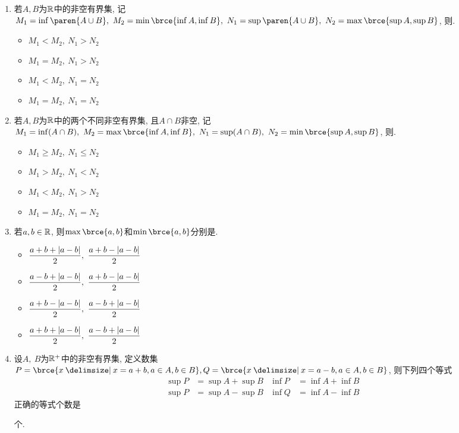 \documentclass[a4paper,punct=CCT]{ctexbook}
\theoremstyle{break}
\newif\ifshowsol
\let\leq\leqslant
\let\le\leq
\let\geq\geqslant
\let\ge\geq}
\begin{document}
\begin{enumerate}
\item 若\(A, B\)为\(\mathbb{R}\)中的非空有界集, 记\(M_1 = \inf\paren{A \cup B},\ M_2 = \min\brce{\inf A, \inf B},\ N_1 = \sup\paren{A \cup B},\ N_2 = \max\brce{\sup A, \sup B}\), 则\uline{\makebox[4em]{}}.
  \begin{itemize}
    \renewcommand{\labelitemi}{\faCircleThin}
  \item \(M_1 < M_2,\ N_1 > N_2\)
  \item \(M_1 = M_2,\ N_1 > N_2\)
  \item \(M_1 < M_2,\ N_1 = N_2\)
    \ifshowsol
  \item[\faCircle] \(M_1 = M_2,\ N_1 = N_2\)
    \else
  \item \(M_1 = M_2,\ N_1 = N_2\)
    \fi
  \end{itemize}

\item 若\(A, B\)为\(\mathbb{R}\)中的两个不同非空有界集, 且\(A \cap B\)非空, 记\(M_1 = \inf(A \cap B),\ M_2 = \max\brce{\inf A, \inf B},\ N_1 = \sup(A \cap B),\ N_2 = \min\brce{\sup A, \sup B}\), 则\uline{\makebox[4em]{}}.
  \begin{itemize}
    \renewcommand{\labelitemi}{\faCircleThin}
    \ifshowsol
  \item[\faCircle] \(M_1 \ge M_2,\ N_1 \le N_2\)
    \else
  \item \(M_1 \ge M_2,\ N_1 \le N_2\)
    \fi
  \item \(M_1 > M_2,\ N_1 < N_2\)
  \item \(M_1 < M_2,\ N_1 > N_2\)
  \item \(M_1 = M_2,\ N_1 = N_2\)
  \end{itemize}

\item 若\(a, b \in \mathbb{R}\), 则\(\max\brce{a, b}\)和\(\min\brce{a,b}\)分别是\uline{\makebox[4em]{}}.
  \begin{itemize}
    \renewcommand{\labelitemi}{\faCircleThin}
    \ifshowsol
  \item[\faCircle] \(\displaystyle \frac{a+b+\abs{a-b}}{2},\ \frac{a+b-\abs{a-b}}{2}\)
    \else
  \item \(\displaystyle \frac{a+b+\abs{a-b}}{2},\ \frac{a+b-\abs{a-b}}{2}\)
    \fi
  \item \(\displaystyle \frac{a-b+\lvert a-b\rvert}{2},\ \frac{a+b-\lvert a-b\rvert}{2}\)
  \item \(\displaystyle \frac{a+b-\lvert a-b\rvert}{2},\ \frac{a-b+\lvert a-b\rvert}{2}\)
  \item \(\displaystyle \frac{a+b+\lvert a-b\rvert}{2},\ \frac{a-b+\lvert a-b\rvert}{2}\)
  \end{itemize}

\item 设\(A,\ B\)为\(\mathbb{R}^+\)中的非空有界集, 定义数集\(P = \brce{x \mid x = a + b, a \in A, b \in B}, Q = \brce{x \mid x = a - b, a \in A, b \in B}\), 则下列四个等式
  \begin{align*}
    \sup P &= \sup A + \sup B & \inf P &= \inf A + \inf B \\
    \sup P &= \sup A - \sup B & \inf Q &= \inf A - \inf B
  \end{align*}
  正确的等式个数是
  \ifshowsol
  \uline{\makebox[4em]{\(2\)}}%
  \else
  \uline{\makebox[4em]{}}%
  \fi
  个.
\end{enumerate}
\fi
\end{document}

